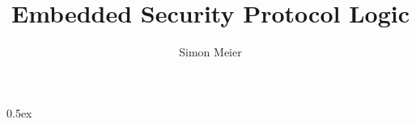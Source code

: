 \documentclass[11pt,a4paper]{article}
\begin{document}
\title{Embedded Security Protocol Logic}
\author{Simon Meier}
\maketitle

\tableofcontents

\parindent 0pt\parskip 0.5ex



%
%
\end{document}
